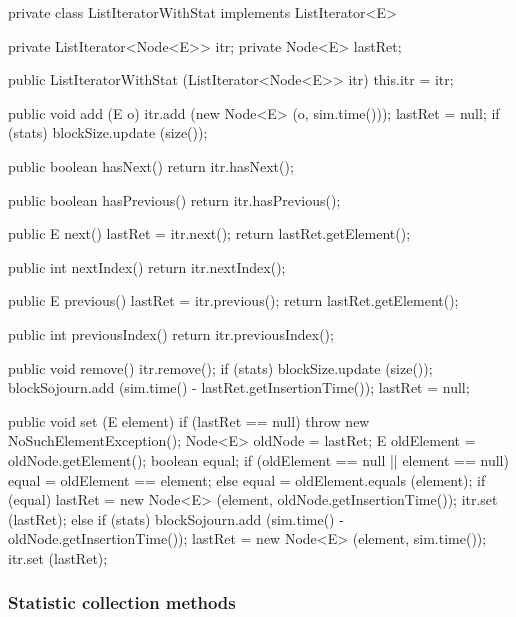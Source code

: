 \begin{code}
\begin{hide}
   private class ListIteratorWithStat implements ListIterator<E> {
      private ListIterator<Node<E>> itr;
      private Node<E> lastRet;

      public ListIteratorWithStat (ListIterator<Node<E>> itr) {
         this.itr = itr;
      }

      public void add (E o) {
         itr.add (new Node<E> (o, sim.time()));
         lastRet = null;
         if (stats)
            blockSize.update (size());
      }

      public boolean hasNext() {
         return itr.hasNext();
      }

      public boolean hasPrevious() {
         return itr.hasPrevious();
      }

      public E next() {
         lastRet = itr.next();
         return lastRet.getElement();
      }

      public int nextIndex() {
         return itr.nextIndex();
      }

      public E previous() {
         lastRet = itr.previous();
         return lastRet.getElement();
      }

      public int previousIndex() {
         return itr.previousIndex();
      }

      public void remove() {
         itr.remove();
         if (stats) {
            blockSize.update (size());
            blockSojourn.add (sim.time() - lastRet.getInsertionTime());
         }
         lastRet = null;
      }

      public void set (E element) {
         if (lastRet == null)
            throw new NoSuchElementException();
         Node<E> oldNode = lastRet;
         E oldElement = oldNode.getElement();
         boolean equal;
         if (oldElement == null || element == null)
            equal = oldElement == element;
         else
            equal = oldElement.equals (element);
         if (equal) {
            lastRet = new Node<E> (element, oldNode.getInsertionTime());
            itr.set (lastRet);
         }
         else {
            if (stats)
               blockSojourn.add (sim.time() - oldNode.getInsertionTime());
            lastRet = new Node<E> (element, sim.time());
            itr.set (lastRet);
         }
      }
   }
\end{hide}
\end{code}

\subsubsection* {Statistic collection methods}

